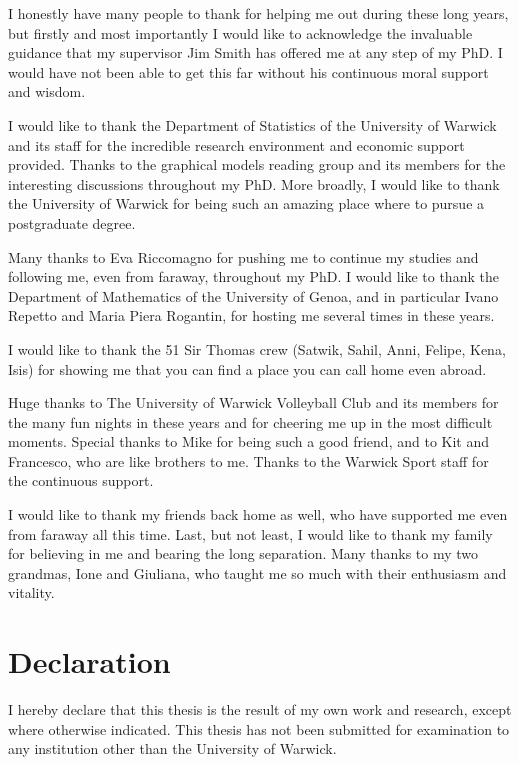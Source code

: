 \documentclass[11pt, oneside]{Thesis} %
\begin{document}
I honestly have many people to thank for helping me out during these long years, but firstly and most importantly I would like to acknowledge the invaluable guidance that my supervisor Jim Smith has offered me at any step of my PhD. I would have not been able to get this far without his continuous moral support and wisdom. 

I would like to thank the Department of Statistics of the University of Warwick and its staff for the incredible research environment and economic support provided. Thanks to the graphical models reading group and its members for the interesting discussions throughout my PhD. More broadly, I would like to thank the University of Warwick for being such an amazing place where to pursue a postgraduate degree. 

Many thanks to Eva Riccomagno for pushing me to continue my studies and following me, even from faraway, throughout my PhD. I would like to thank the Department of Mathematics of the University of Genoa, and in particular Ivano Repetto and Maria Piera Rogantin, for hosting me several times in these years.
 
I would like to thank the 51 Sir Thomas crew (Satwik, Sahil, Anni, Felipe, Kena, Isis) for showing me that you can find a place you can call home even abroad.  

Huge thanks to The University of Warwick Volleyball Club and its members for the many fun nights in these years and for cheering me up in the most difficult moments. Special thanks to Mike  for being such a good friend, and to Kit and Francesco, who are like brothers to me. Thanks to the Warwick Sport staff for the continuous support. 

I would like to thank my friends back home as well, who have supported me even from faraway all this time. Last, but not least, I would like to thank my family for believing in me and bearing the long separation. Many thanks to my two grandmas, Ione and Giuliana, who taught me so much with their enthusiasm and vitality.

\clearpage

\chapter*{Declaration}
\label{declaration}
\thispagestyle{empty}

I hereby declare that this thesis is the result of my own work and research, except where otherwise indicated. This thesis has not been submitted for examination to any institution other than the University of Warwick.
\end{document}
